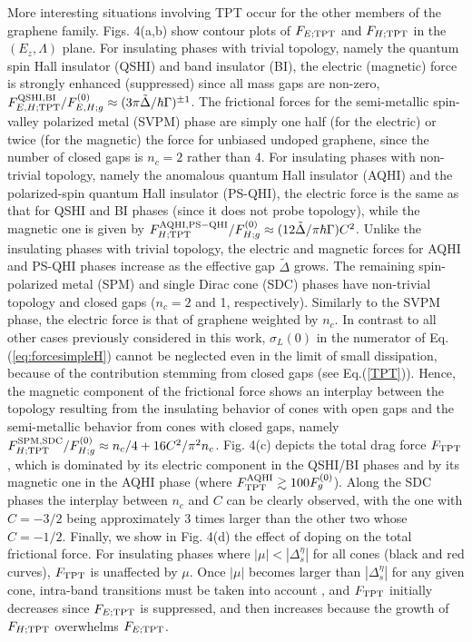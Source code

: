 \documentclass[10pt,aps,prl,superscriptaddress,showpacs,twocolumn]{revtex4-1}
\begin{document}
More interesting situations involving TPT occur for the other members of the graphene family. Figs. 4(a,b) show contour plots of 
$F_{E;{\rm TPT}}$ and $F_{H;{\rm TPT}}$ in the $(E_z, \Lambda)$ plane. For insulating phases with trivial topology, namely the quantum spin Hall insulator (QSHI) and band insulator (BI), the electric (magnetic) force is strongly enhanced (suppressed) since all mass gaps are non-zero, $F^{{\rm QSHI,BI}}_{E,H;{\rm TPT}}/F_{E,H;g}^{(0)} \approx (3 \pi \tilde{\Delta}/\hbar \Gamma)^{\pm 1}$. The frictional forces for the semi-metallic spin-valley polarized metal (SVPM) phase are simply one half (for the electric) or twice (for the magnetic) the force for unbiased undoped graphene, since the number of closed gaps is $n_c=2$ rather than 4. For insulating phases with non-trivial topology, namely the anomalous quantum Hall insulator (AQHI) and the polarized-spin quantum Hall insulator (PS-QHI), the electric force is the same as that for QSHI and BI phases (since it does not probe topology), while the magnetic one is given by
$F^{{\rm AQHI,PS-QHI}}_{H;{\rm TPT}}/F_{H;g}^{(0)} \approx  (12 \tilde{\Delta} / \pi \hbar \Gamma) C^2$. Unlike the insulating phases with trivial topology, the electric and magnetic forces for AQHI and PS-QHI phases increase as the effective gap $\tilde{\Delta}$ grows. The remaining spin-polarized metal (SPM) and single Dirac cone (SDC) phases have non-trivial topology and closed gaps ($n_c=2$ and 1, respectively). Similarly to the SVPM phase, the electric force is that of graphene weighted by $n_c$. In contrast to all other cases previously considered in this work, $\sigma_L(0)$ in the numerator of Eq.(\ref{eq:forcesimpleH}) cannot be neglected even in the limit of small dissipation, because of the contribution stemming from closed gaps (see Eq.(\ref{TPT})). Hence, the magnetic component of the frictional force shows an interplay between the topology resulting from the insulating behavior of cones with open gaps and the semi-metallic behavior from cones with closed gaps, namely 
$F^{{\rm SPM,SDC}}_{H;{\rm TPT}}/F_{H;g}^{(0)} \approx n_c/4 + 16 C^2/\pi^2 n_c$. Fig. 4(c) depicts the total drag force $F_{\rm TPT}$, which is dominated by its electric component in the QSHI/BI phases and by its magnetic one in the AQHI phase (where $F^{\rm AQHI}_{\rm TPT} \gtrsim 100  F^{(0)}_g$). Along the SDC phases the interplay between $n_c$ and $C$ can be clearly observed, with the one with $C=-3/2$  being approximately 3 times larger than the other two whose $C=-1/2$. 
Finally, we show in Fig. 4(d) the effect of doping on the total frictional force. For insulating phases where  $|\mu| < |\Delta^{\eta}_s|$ for all cones (black and red curves), $F_{\rm TPT}$ is unaffected by $\mu$. Once $|\mu|$ becomes larger than $|\Delta^{\eta}_s|$ for any given cone, intra-band transitions must be taken into account \cite{Tse2010,KortKamp2017}, and $F_{\rm TPT}$ initially decreases since $F_{E;{\rm TPT}}$ is  suppressed, and then increases because the growth of $F_{H;{\rm TPT}}$ overwhelms $F_{E;{\rm TPT}}$.  
\end{document}
